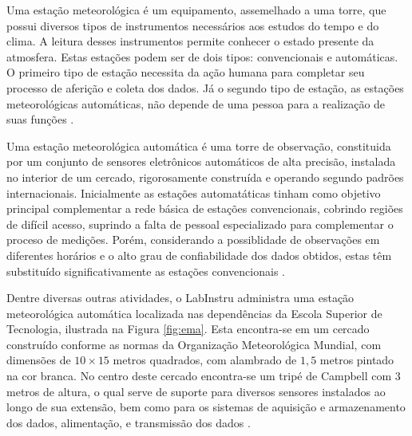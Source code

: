 Uma estação meteorológica é um equipamento, assemelhado a uma torre, que possui diversos tipos de instrumentos necessários aos estudos do tempo e do clima. A leitura desses instrumentos permite conhecer o estado presente da atmosfera. Estas estações podem ser de dois tipos: convencionais e automáticas. O primeiro tipo de estação necessita da ação humana para completar seu processo de aferição e coleta dos dados. Já o segundo tipo de estação, as estações meteorológicas automáticas, não depende de uma pessoa para a realização de suas funções \cite{Vianello:Livro}.

Uma estação meteorológica automática é uma torre de observação, constituida por um conjunto de sensores eletrônicos automáticos de alta precisão, instalada no interior de um cercado, rigorosamente construída e operando segundo padrões internacionais. Inicialmente as estações automatáticas tinham como objetivo principal complementar a rede básica de estações convencionais, cobrindo regiões de difícil acesso, suprindo a falta de pessoal especializado para complementar o proceso de medições. Porém, considerando a possiblidade de observações em diferentes horários e o alto grau de confiabilidade dos dados obtidos, estas têm substituído significativamente as estações convencionais  \cite{Vianello:Livro}.

Dentre diversas outras atividades, o LabInstru administra uma estação meteorológica automática localizada nas dependências da Escola Superior de Tecnologia, ilustrada na Figura \ref{fig:ema}. Esta encontra-se em um cercado construído conforme as normas da Organização Meteorológica Mundial, com dimensões de $10 \times 15$ metros quadrados, com alambrado de $1,5$ metros pintado na cor branca. No centro deste cercado encontra-se um tripé de Campbell com $3$ metros de altura, o qual serve de suporte para diversos sensores instalados ao longo de sua extensão, bem como para os sistemas de aquisição e armazenamento dos dados, alimentação, e transmissão dos dados \cite{Labinstru:EST}.

\newpage

